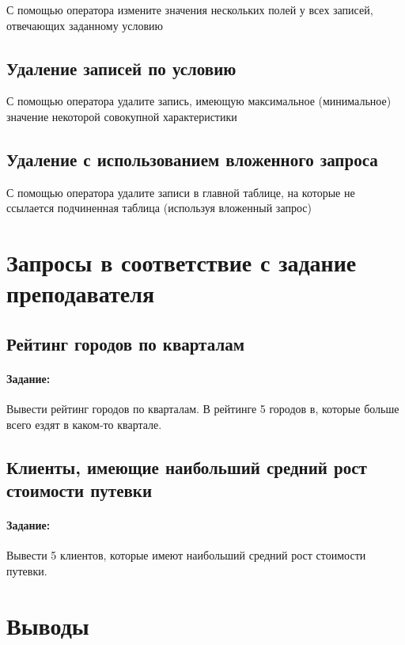 С помощью оператора  измените значения нескольких полей у всех записей, отвечающих заданному условию

\subsection{Удаление записей по условию}

С помощью оператора  удалите запись, имеющую максимальное (минимальное) значение некоторой совокупной характеристики

\subsection{Удаление с использованием вложенного запроса}

С помощью оператора  удалите записи в главной таблице, на которые не ссылается подчиненная таблица (используя вложенный запрос)

\section{Запросы в соответствие с задание преподавателя}

\subsection{Рейтинг городов по кварталам}

\paragraph{Задание:} Вывести рейтинг городов по кварталам. В рейтинге 5 городов в, которые больше всего ездят в каком-то квартале.



\subsection{Клиенты, имеющие наибольший средний рост стоимости путевки}

\paragraph{Задание:} Вывести 5 клиентов, которые имеют наибольший средний рост стоимости путевки.



\section{Выводы}




